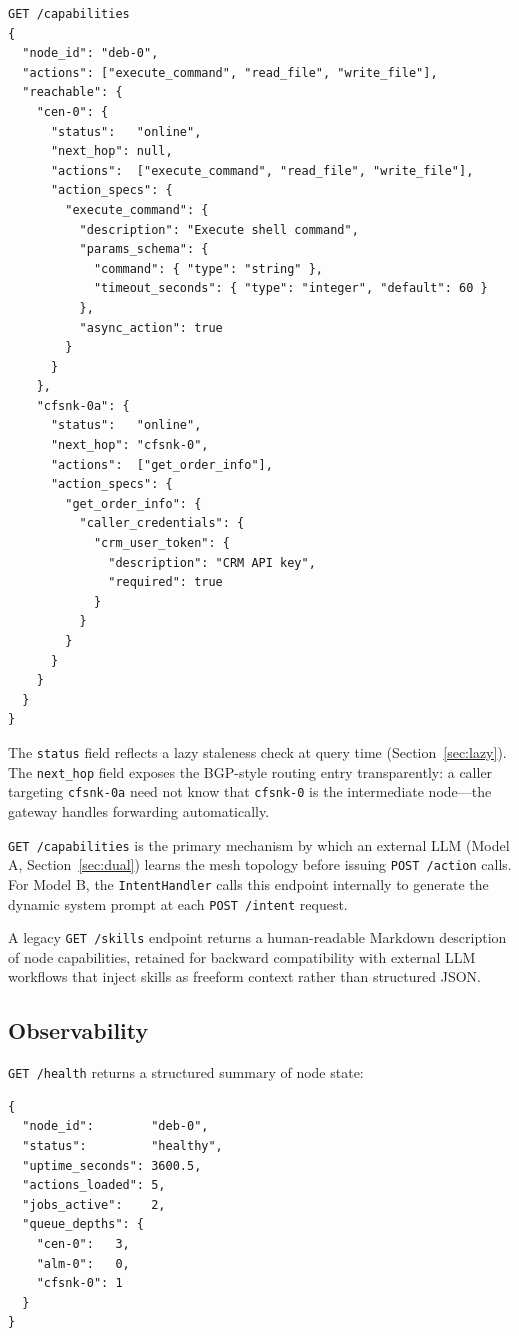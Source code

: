 \documentclass[10pt,twocolumn]{article}
\begin{document}
\begin{lstlisting}[caption={Capability tree response (excerpt)}]
GET /capabilities
{
  "node_id": "deb-0",
  "actions": ["execute_command", "read_file", "write_file"],
  "reachable": {
    "cen-0": {
      "status":   "online",
      "next_hop": null,
      "actions":  ["execute_command", "read_file", "write_file"],
      "action_specs": {
        "execute_command": {
          "description": "Execute shell command",
          "params_schema": {
            "command": { "type": "string" },
            "timeout_seconds": { "type": "integer", "default": 60 }
          },
          "async_action": true
        }
      }
    },
    "cfsnk-0a": {
      "status":   "online",
      "next_hop": "cfsnk-0",
      "actions":  ["get_order_info"],
      "action_specs": {
        "get_order_info": {
          "caller_credentials": {
            "crm_user_token": {
              "description": "CRM API key",
              "required": true
            }
          }
        }
      }
    }
  }
}
\end{lstlisting}

The \texttt{status} field reflects a lazy staleness check at query
time (Section~\ref{sec:lazy}). The \texttt{next\_hop} field exposes
the BGP-style routing entry transparently: a caller targeting
\texttt{cfsnk-0a} need not know that \texttt{cfsnk-0} is the
intermediate node---the gateway handles forwarding automatically.

\texttt{GET /capabilities} is the primary mechanism by which an
external LLM (Model A, Section~\ref{sec:dual}) learns the mesh
topology before issuing \texttt{POST /action} calls. For Model B, the
\texttt{IntentHandler} calls this endpoint internally to generate the
dynamic system prompt at each \texttt{POST /intent} request.

A legacy \texttt{GET /skills} endpoint returns a human-readable
Markdown description of node capabilities, retained for backward
compatibility with external LLM workflows that inject skills as
freeform context rather than structured JSON.

\subsection{Observability}
\label{sec:health}

\texttt{GET /health} returns a structured summary of node state:

\begin{lstlisting}[caption={Health endpoint response}]
{
  "node_id":        "deb-0",
  "status":         "healthy",
  "uptime_seconds": 3600.5,
  "actions_loaded": 5,
  "jobs_active":    2,
  "queue_depths": {
    "cen-0":   3,
    "alm-0":   0,
    "cfsnk-0": 1
  }
}
\end{lstlisting}
\end{document}

